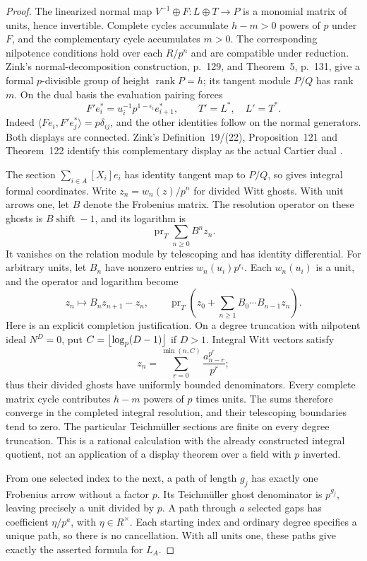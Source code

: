 \documentclass[11pt,a4paper]{article}
\theoremstyle{definition}\newtheorem{remark}[theorem]{Remark}
\begin{document}
\begin{proof}
The linearized normal map $V^{-1}\oplus F:L\oplus T\to P$ is a monomial matrix of units, hence invertible. Complete cycles accumulate $h-m>0$ powers of $p$ under $F$, and the complementary cycle accumulates $m>0$. The corresponding nilpotence conditions hold over each $R/p^n$ and are compatible under reduction. Zink's normal-decomposition construction, p.~129, and Theorem~5, p.~131, give a formal $p$-divisible group of height $\operatorname{rank}P=h$; its tangent module $P/Q$ has rank $m$. On the dual basis the evaluation pairing forces
\[
 F'e_i^*=u_i^{-1}p^{1-\epsilon_i}e_{i+1}^*,\qquad
 T'=L^*,\quad L'=T^*.
\]
Indeed $\langle Fe_i,F'e_j^*\rangle=p\delta_{ij}$, and the other identities follow on the normal generators. Both displays are connected. Zink's Definition~19/(22), Proposition~121 and Theorem~122 identify this complementary display as the actual Cartier dual \cite{Zink}.

The section $\sum_{i\in A}[X_i]e_i$ has identity tangent map to $P/Q$, so gives integral formal coordinates. Write $z_n=w_n(z)/p^n$ for divided Witt ghosts. With unit arrows one, let $B$ denote the Frobenius matrix. The resolution operator on these ghosts is $B\operatorname{shift}-1$, and its logarithm is
\[
 \operatorname{pr}_T\sum_{n\ge0}B^nz_n.
\]
It vanishes on the relation module by telescoping and has identity differential. For arbitrary units, let $B_n$ have nonzero entries $w_n(u_i)p^{\epsilon_i}$. Each $w_n(u_i)$ is a unit, and the operator and logarithm become
\[
 z_n\longmapsto B_nz_{n+1}-z_n,\qquad
 \operatorname{pr}_T\left(z_0+\sum_{n\ge1}B_0\cdots B_{n-1}z_n\right).
\]
Here is an explicit completion justification. On a degree truncation with nilpotent ideal $N^D=0$, put $C=\left\lfloor \log_p(D-1)\right\rfloor$ if $D>1$. Integral Witt vectors satisfy
\[
 z_n=\sum_{r=0}^{\min(n,C)}
       \frac{a_{n-r}^{p^r}}{p^r};
\]
thus their divided ghosts have uniformly bounded denominators. Every complete matrix cycle contributes $h-m$ powers of $p$ times units. The sums therefore converge in the completed integral resolution, and their telescoping boundaries tend to zero. The particular Teichm\"uller sections are finite on every degree truncation. This is a rational calculation with the already constructed integral quotient, not an application of a display theorem over a field with $p$ inverted.

From one selected index to the next, a path of length $g_j$ has exactly one Frobenius arrow without a factor $p$. Its Teichm\"uller ghost denominator is $p^{g_j}$, leaving precisely a unit divided by $p$. A path through $a$ selected gaps has coefficient $\eta/p^a$, with $\eta\in R^\times$. Each starting index and ordinary degree specifies a unique path, so there is no cancellation. With all units one, these paths give exactly the asserted formula for $L_A$.


\end{proof}
\end{document}
